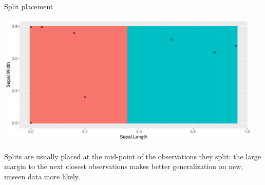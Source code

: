\documentclass[11pt,compress,t,notes=noshow, xcolor=table]{beamer}
\newenvironment{knitrout}{}{} %
\begin{document}
\begin{vbframe}{Split placement}
\begin{knitrout}\scriptsize
{}\color{fgcolor}

{\centering \includegraphics[width=0.95\textwidth]{figure/cart_treegrow_4}

}



\end{knitrout}
\lz
Splits are usually placed at the mid-point of the observations they split: the large margin to the next closest observations makes better generalization on new, unseen data more likely.
\end{vbframe}

%
%
%
%






\endlecture
\end{document}
